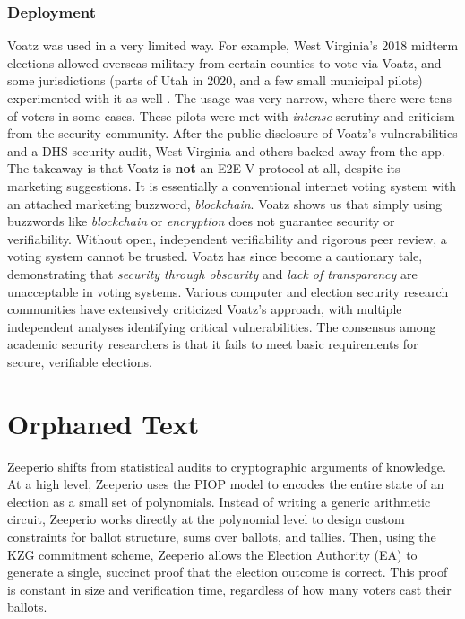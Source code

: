 \subsubsection{Deployment}
Voatz was used in a very limited way. 
For example, West Virginia's 2018 midterm elections allowed overseas military from certain counties to vote via Voatz, and some jurisdictions (parts of Utah in 2020, and a few small municipal pilots) experimented with it as well \cite{moore-sawhney-wv-mobile-voting-2019}. 
The usage was very narrow, where there were tens of voters in some cases. 
These pilots were met with \emph{intense} scrutiny and criticism from the security community. 
After the public disclosure of Voatz's vulnerabilities and a DHS security audit, West Virginia and others backed away from the app. 
The takeaway is that Voatz is \textbf{not} an E2E-V protocol at all, despite its marketing suggestions. 
It is essentially a conventional internet voting system with an attached marketing buzzword, \emph{blockchain}.
Voatz shows us that simply using buzzwords like \emph{blockchain} or \emph{encryption} does not guarantee security or verifiability. 
Without open, independent verifiability and rigorous peer review, a voting system cannot be trusted. 
Voatz has since become a cautionary tale, demonstrating that \emph{security through obscurity} and \emph{lack of transparency} are unacceptable in voting systems. 
Various computer and election security research communities have extensively criticized Voatz's approach, with multiple independent analyses identifying critical vulnerabilities. 
The consensus among academic security researchers is that it fails to meet basic requirements for secure, verifiable elections.


\section{Orphaned Text}

Zeeperio shifts from statistical audits to cryptographic arguments of knowledge. 
At a high level, Zeeperio uses the PIOP model to encodes the entire state of an election as a small set of polynomials. 
Instead of writing a generic arithmetic circuit, Zeeperio works directly at the polynomial level to design custom constraints for ballot structure, sums over ballots, and tallies.
Then, using the KZG commitment scheme, Zeeperio allows the Election Authority (EA) to generate a single, succinct proof that the election outcome is correct.
This proof is constant in size and verification time, regardless of how many voters cast their ballots.

